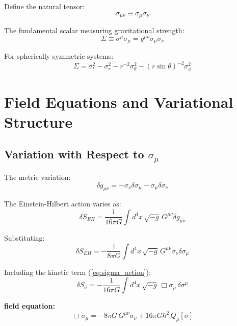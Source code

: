 \documentclass[11pt,a4paper]{article}
\theoremstyle{definition}
\theoremstyle{remark}
\begin{document}
	Define the natural tensor:
	\begin{equation}
		\sigma_{\mu\nu} \equiv \sigma_\mu\sigma_\nu
	\end{equation}
	
	The fundamental scalar measuring gravitational strength:
	\begin{equation}\label{eq:natural_scalar}
		\Sigma \equiv \sigma^\mu\sigma_\mu = g^{\mu\nu}\sigma_\mu\sigma_\nu
	\end{equation}
	
	For spherically symmetric systems:
	\begin{equation}
		\Sigma = \sigma_t^2 - \sigma_r^2 - r^{-2}\sigma_\theta^2 - (r\sin\theta)^{-2}\sigma_\phi^2
	\end{equation}
	
	\section{Field Equations and Variational Structure}
	
	\subsection{Variation with Respect to $\sigma_\mu$}
	
	The metric variation:
	\begin{equation}
		\delta g_{\mu\nu} = -\sigma_\nu\delta\sigma_\mu - \sigma_\mu\delta\sigma_\nu
	\end{equation}
	
	The Einstein-Hilbert action varies as:
	\begin{equation}
		\delta S_{EH} = \frac{1}{16\pi G}\int d^4x\, \sqrt{-g}\, G^{\mu\nu}\delta g_{\mu\nu}
	\end{equation}
	
	Substituting:
	\begin{equation}
		\delta S_{EH} = -\frac{1}{8\pi G}\int d^4x\, \sqrt{-g}\, G^{\mu\nu}\sigma_\nu\delta\sigma_\mu
	\end{equation}
	
	Including the kinetic term (\ref{eq:sigma_action}):
	\begin{equation}
		\delta S_\sigma = -\frac{1}{16\pi G}\int d^4x\, \sqrt{-g}\, \Box\sigma_\mu\, \delta\sigma^\mu
	\end{equation}
	
	\textbf{field equation:}
	\begin{equation}\label{eq:sigma_field_eq}
		\boxed{\Box\sigma_\mu = -8\pi G\, G^{\mu\nu}\sigma_\nu + 16\pi G\hbar^2\, Q_\mu[\sigma]}
	\end{equation}
	
\end{document}

